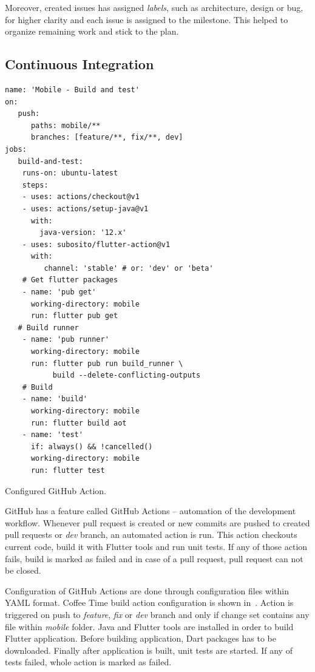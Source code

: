 Moreover, created issues has assigned \textit{labels}, such as architecture, design or bug, for higher clarity and each issue is assigned to the milestone. This helped to organize remaining work and stick to the plan. 

\subsection{Continuous Integration}

\begin{listing}[!h]
\begin{verbatim}
name: 'Mobile - Build and test'
on:
   push:
      paths: mobile/**
      branches: [feature/**, fix/**, dev]
jobs:
   build-and-test: 
    runs-on: ubuntu-latest
    steps:
    - uses: actions/checkout@v1 
    - uses: actions/setup-java@v1
      with:
        java-version: '12.x'
    - uses: subosito/flutter-action@v1
      with:
         channel: 'stable' # or: 'dev' or 'beta'
    # Get flutter packages
    - name: 'pub get'
      working-directory: mobile
      run: flutter pub get
   # Build runner
    - name: 'pub runner'
      working-directory: mobile
      run: flutter pub run build_runner \ 
           build --delete-conflicting-outputs
    # Build
    - name: 'build'
      working-directory: mobile
      run: flutter build aot
    - name: 'test'
      if: always() && !cancelled()
      working-directory: mobile
      run: flutter test
\end{verbatim}
\caption{Configured GitHub Action.}
\label{listing:gh-ci}
\end{listing}

GitHub has a feature called GitHub Actions -- automation of the development workflow. Whenever pull request is created or new commits are pushed to created pull requests or \textit{dev} branch, an automated action is run. This action checkouts current code, build it with Flutter tools and run unit tests. If any of those action fails, build is marked as failed and in case of a pull request, pull request can not be closed. 

Configuration of GitHub Actions are done through configuration files within YAML format. Coffee Time build action configuration is shown in~. Action is triggered on push to \textit{feature}, \textit{fix} or \textit{dev} branch and only if change set contains any file within \textit{mobile} folder. Java and Flutter tools are installed in order to build Flutter application. Before building application, Dart packages has to be downloaded. Finally after application is built, unit tests are started. If any of tests failed, whole action is marked as failed.

